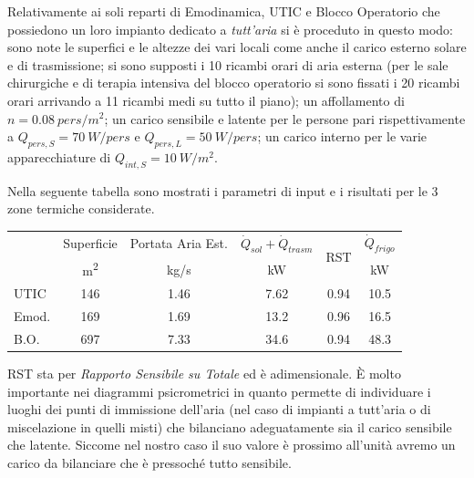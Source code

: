 Relativamente ai soli reparti di Emodinamica, UTIC e Blocco Operatorio che possiedono un loro impianto dedicato a \emph{tutt'aria} si è proceduto in questo modo:
sono note le superfici e le altezze dei vari locali come anche il carico esterno solare e di trasmissione; si sono supposti i \num{10} ricambi orari di aria esterna (per le sale chirurgiche e di terapia intensiva del blocco operatorio si sono fissati i \num{20} ricambi orari arrivando a \num{11} ricambi medi su tutto il piano); un affollamento di $n=\SI{0.08}{pers/m^2}$; un carico sensibile e latente per le persone pari rispettivamente a $Q_{pers,S}=\SI{70}{W/pers}$ e $Q_{pers,L}=\SI{50}{W/pers}$; un carico interno per le varie apparecchiature di $Q_{int,S}=\SI{10}{W/m^2}$. 

Nella seguente tabella sono mostrati i parametri di input e i risultati per le 3 zone termiche considerate.
\begin{center}
	\begin{tabular}{lccccc}
		\toprule
					&	Superficie 				&	Portata Aria Est. 			&	$\dot{Q}_{sol}+\dot{Q}_{trasm}$		& 	\multirow{2}{*}{RST}		&	$\dot{Q}_{frigo}$ 	\\
					&	{\small \si{m^2}}		&		{\small \si{kg/s}}		&		{\small \si{kW}}				&								&{\small \si{kW}}		\\					
		\midrule	
		UTIC		&		\num{146}			&		\num{1.46}				&	\num{7.62}		&	0.94					&	\num{10.5}		\\
		Emod.		&		\num{169}			&		\num{1.69}				&	\num{13.2}		&	0.96					&	\num{16.5}		\\
		B.O.		&	\num{697}				&		\num{7.33}				&	\num{34.6}		&	0.94					&	\num{48.3}		\\
		\bottomrule
	\end{tabular}
\end{center}
RST sta per \emph{Rapporto Sensibile su Totale} ed è adimensionale. È molto importante nei diagrammi psicrometrici in quanto permette di individuare i luoghi dei punti di immissione dell'aria (nel caso di impianti a tutt'aria o di miscelazione in quelli misti) che bilanciano adeguatamente sia il carico sensibile che latente. Siccome nel nostro caso il suo valore è prossimo all'unità avremo un carico da bilanciare che è pressoché tutto sensibile.

